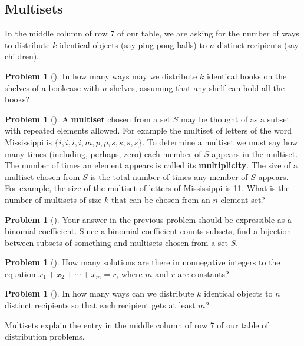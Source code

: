 \documentclass[10pt,]{book}
\newcommand{\terminology}[1]{\textbf{#1}}
\theoremstyle{plain}
\theoremstyle{definition}
\newtheorem{activity}[project]{Problem}
\theoremstyle{definition}
\numberwithin{equation}{chapter}
\newcommand{\importantarrow}{\Rightarrow}
\begin{document}
\subsection[{Multisets}]{Multisets}\label{subsection-30}
In the middle column of row 7 of our table, we are asking for the number of ways to distribute \(k\) identical objects (say ping-pong balls) to \(n\) distinct recipients (say children).%
\begin{activity}[] \label{identicalbooks}
In how many ways may we distribute \(k\) identical books on the shelves of a bookcase with \(n\) shelves, assuming that any shelf can hold all the books?%
\end{activity}
\begin{activity}[] \label{multiset}
A \terminology{multiset} chosen from a set \(S\) may be thought of as a subset with repeated elements allowed. For example the multiset of letters of the word Mississippi is \(\{i,i,i,i,m,p,p,s,s,s,s\}\). To determine a multiset we must say how many times (including, perhaps, zero) each member of \(S\) appears in the multiset. The number of times an element appears is called its \terminology{multiplicity}. The size of a multiset chosen from \(S\) is the total number of times any member of \(S\) appears. For example, the size of the multiset of letters of Mississippi is 11. What is the number of multisets of size \(k\) that can be chosen from an \(n\)-element set?%
\end{activity}
\begin{activity}[]\marginsymbol[-1em]{\pdftooltip{$\importantarrow$}{especially interesting}} \label{activity-126}
Your answer in the previous problem should be expressible as a binomial coefficient. Since a binomial coefficient counts subsets, find a bijection between subsets of something and multisets chosen from a set \(S\).%
\end{activity}
\begin{activity}[]\marginsymbol[-1em]{} \label{activity-127}
How many solutions are there in nonnegative integers to the equation \(x_1+x_2+ \cdots +x_m = r\), where \(m\) and \(r\) are constants?%
\end{activity}
\begin{activity}[]\marginsymbol[-1em]{} \label{k-obj-n-recip}
In how many ways can we distribute \(k\) identical objects to \(n\) distinct recipients so that each recipient gets at least \(m\)?%
\end{activity}
Multisets explain the entry in the middle column of row 7 of our table of distribution problems.%
\typeout{************************************************}
\typeout{************************************************}
\end{document}
